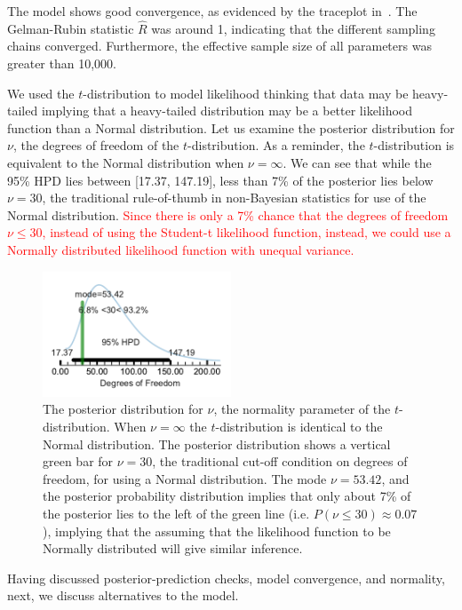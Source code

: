 The model shows good convergence, as evidenced by the traceplot in~. The Gelman-Rubin statistic $\hat{R}$ was around 1, indicating that the different sampling chains converged. Furthermore, the effective sample size of all parameters was greater than 10,000.

We used the $t$-distribution to model likelihood thinking that data may be heavy-tailed implying that a heavy-tailed distribution may be a better likelihood function than a  Normal distribution. Let us examine the posterior distribution for $\nu$, the degrees of freedom of the $t$-distribution. As a reminder, the $t$-distribution is equivalent to the Normal distribution when $\nu=\infty$. We can see that while the 95\% HPD lies between [17.37, 147.19], less than 7\% of the posterior lies below $\nu=30$, the traditional rule-of-thumb in non-Bayesian statistics for use of the Normal distribution. \textcolor{red}{Since there is only a 7\% chance that the degrees of freedom $\nu \leq 30$, instead of using the Student-t likelihood function, instead, we could use a Normally distributed likelihood function with unequal variance.}


\begin{figure}[htb]
    \includegraphics[width=0.5\textwidth]{./hari-code/robust_normality.pdf}
    \caption{The posterior distribution for $\nu$, the normality parameter of the $t$-distribution. When $\nu=\infty$ the $t$-distribution is identical to the Normal distribution. The posterior distribution shows a vertical green bar for $\nu=30$, the traditional cut-off condition on degrees of freedom, for using a Normal distribution. The mode $\nu=53.42$, and the posterior probability distribution implies that only about 7\% of the posterior lies to the left of the green line (i.e. $P(\nu \leq 30) \approx 0.07$), implying that the assuming that the likelihood function to be Normally distributed will give similar inference.}
    \label{fig:normality}
\end{figure}

Having discussed posterior-prediction checks, model convergence, and normality, next, we discuss alternatives to the model.

